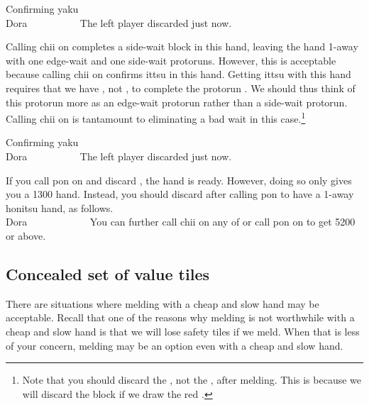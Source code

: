 \bigskip
\begin{itembox}[r]{Confirming {\jap yaku}}
\bp
{}\rfs{}~~\\
\hfill\footnotesize{{\jap Dora}~~~~~~~~~~}
\ep
\vspace{-20pt}The left player discarded {\LARGE{}} just now.
\end{itembox}
\noindent
Calling {\jap chii} on {\LARGE{}} completes a side-wait block in this hand, leaving the hand 1-away with one edge-wait and one side-wait protoruns. 
However, this is acceptable because calling {\jap chii} on {\LARGE{}} confirms {\jap ittsu} in this hand. Getting {\jap ittsu} with this hand requires that we have {\LARGE{}}, not {\LARGE{}}, to complete the protorun {\LARGE{}}. We should thus think of this protorun more as an edge-wait protorun rather than a side-wait protorun. Calling {\jap chii} on {\LARGE{}} is tantamount to eliminating a bad wait in this case.\footnote{Note that you should discard the , not the , after melding. This is because we will discard the {} block if we draw the red \rfw.}

\bigskip
\begin{itembox}[r]{Confirming {\jap yaku}}
\bp
{}\dong\dong\dong\nan\nan~~\fa\\
\hfill\footnotesize{{\jap Dora}~~~~~~~~~~}
\ep {}
\vspace{-20pt}The left player discarded {\LARGE{}} just now.
\end{itembox}
\noindent
If you call {\jap pon} on {\LARGE{}} and discard {\LARGE{}}, the hand is ready. However, doing so only gives you a 1300 hand. Instead, you should discard {\LARGE{}} after calling {\jap pon} to have a 1-away {\jap honitsu} hand, as follows.
\bp
{}\dong\dong\dong\nan\nan~~~\fa\\
\hfill\footnotesize{{\jap Dora}~~~~~~~~~~~~}
\ep
You can further call {\jap chii} on any of {\LARGE{}} or call {\jap pon} on {\LARGE\nan} to get 5200 or above. 

\subsection{Concealed set of value tiles}
There are situations where melding with a cheap and slow hand may be acceptable. Recall that one of the reasons why melding is not worthwhile with a cheap and slow hand is that we will lose safety tiles if we meld. When that is less of your concern, melding may be an option even with a cheap and slow hand. 

